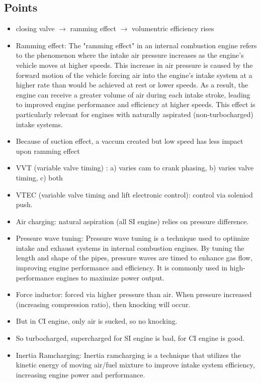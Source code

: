 \documentclass{article}
\begin{document}
\begin{multicols}{2}
  \subsection*{Points}
  \begin{itemize}
    \item closing valve $\rightarrow$ ramming effect $\rightarrow$ volumentric efficiency rises 
    \item Ramming effect: The "ramming effect" in an internal combustion engine refers to the phenomenon where the intake air pressure increases as the engine's vehicle moves at higher speeds. This increase in air pressure is caused by the forward motion of the vehicle forcing air into the engine's intake system at a higher rate than would be achieved at rest or lower speeds. As a result, the engine can receive a greater volume of air during each intake stroke, leading to improved engine performance and efficiency at higher speeds. This effect is particularly relevant for engines with naturally aspirated (non-turbocharged) intake systems.
    \item Because of suction effect, a vaccum created but low speed has less impact upon ramming effect 
    \item VVT (variable valve timing) : a) varies cam to crank phasing, b) varies valve timing, c) both 
    \item VTEC (variable valve timing and lift electronic control): control via soleniod push.
    \item Air charging: natural aspiration (all SI engine) relies on pressure difference. 
    \item Pressure wave tuning: Pressure wave tuning is a technique used to optimize intake and exhaust systems in internal combustion engines. By tuning the length and shape of the pipes, pressure waves are timed to enhance gas flow, improving engine performance and efficiency. It is commonly used in high-performance engines to maximize power output. 
    \item Force inductor: forced via higher pressure than air. When pressure increased (increasing compression ratio), then knocking will occur. 
    \item But in CI engine, only air is sucked, so no knocking.
    \item So turbocharged, supercharged for SI engine is bad, for CI engine is good. 
    \item Inertia Ramcharging: Inertia ramcharging is a technique that utilizes the kinetic energy of moving air/fuel mixture to improve intake system efficiency, increasing engine power and performance.

\end{itemize}
\end{multicols}
\end{document}
